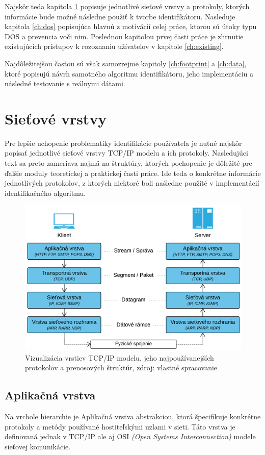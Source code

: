 \documentclass[
  digital, %
  table,   %
  lof,     %
  nolot,   %
  nocover
]{fithesis3}
\begin{document}
Najskôr teda kapitola
\ref{ch:net-layers} popisuje jednotlivé sieťové vrstvy a protokoly, ktorých
informácie bude možné následne použiť k tvorbe identifikátoru. 
Nasleduje kapitola \ref{ch:dos} popisujúca hlavnú z motivácií 
celej práce, ktorou sú útoky typu DOS a prevencia voči nim.
Poslednou kapitolou prvej časti práce je zhrnutie
existujúcich prístupov k rozoznaniu užívateľov v kapitole \ref{ch:existing}.

Najdôležitejšou časťou sú však
samozrejme kapitoly \ref{ch:footprint} a \ref{ch:data}, ktoré popisujú návrh samotného 
algoritmu identifikátoru, jeho implementáciu a následné testovanie s reálnymi dátami.

\chapter{Sieťové vrstvy}
\label{ch:net-layers}
Pre lepšie uchopenie problematiky identifikácie používateľa je nutné najskôr
popísať jednotlivé sieťové vrstvy TCP/IP modelu a
ich protokoly. Nasledujúci text sa preto zameriava najmä na štruktúry, ktorých pochopenie je
dôležité pre ďalšie moduly teoretickej a praktickej časti práce. Ide teda o
konkrétne informácie jednotlivých protokolov, z ktorých niektoré boli naśledne použité v implementácií
identifikačného algoritmu.

\begin{figure}[h]
  \centering
    \includegraphics[width=.99\textwidth]{images/net-layers.png}
  \caption{Vizualizácia vrstiev TCP/IP modelu, jeho najpoužívanejších protokolov
  a prenosových štruktúr, zdroj: vlastné spracovanie}
  \label{fig:net-layers}
\end{figure}

\section{Aplikačná vrstva}
Na vrchole hierarchie je Aplikačná vrstva abstrakciou, ktorá špecifikuje
konkrétne protokoly a metódy používané hostiteľskými uzlami v sieti. Táto
vrstva je definovaná jednak v TCP/IP ale aj OSI
\textit{(Open Systems Interconnection)} modele sieťovej komunikácie.
\end{document}
